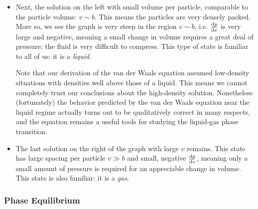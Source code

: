 \documentclass[11pt, a4paper]{article}
\begin{document}
\begin{itemize}
\begin{itemize}
		\item Next, the solution on the left with small volume per particle, comparable to the particle volume: $ v \sim b $. This means the particles are very densely packed. More so, we see the graph is very steep in the region $ v \sim b $, i.e. $ \dv{p}{v} $ is very large and negative, meaning a small change in volume requires a great deal of pressure; the fluid is very difficult to compress. This type of state is familiar to all of us: it is a \textit{liquid}.
		
		Note that our derivation of the van der Waals equation assumed low-density situations with densities well above those of a liquid. This means we cannot completely trust our conclusions about the high-density solution. Nonetheless (fortunately) the behavior predicted by the van der Waals equation near the liquid regime actually turns out to be qualitatively correct in many respects, and the equation remains a useful tools for studying the liquid-gas phase transition.
		
		\item The last solution on the right of the graph with large $ v $ remains. This state has large spacing per particle $ v \gg b $ and small, negative $ \dv{p}{v} $, meaning only a small amount of pressure is required for an appreciable change in volume. This state is also familiar: it is a \textit{gas}.
		
	\end{itemize}
\end{itemize}

\subsubsection{Phase Equilibrium}
\end{document}
